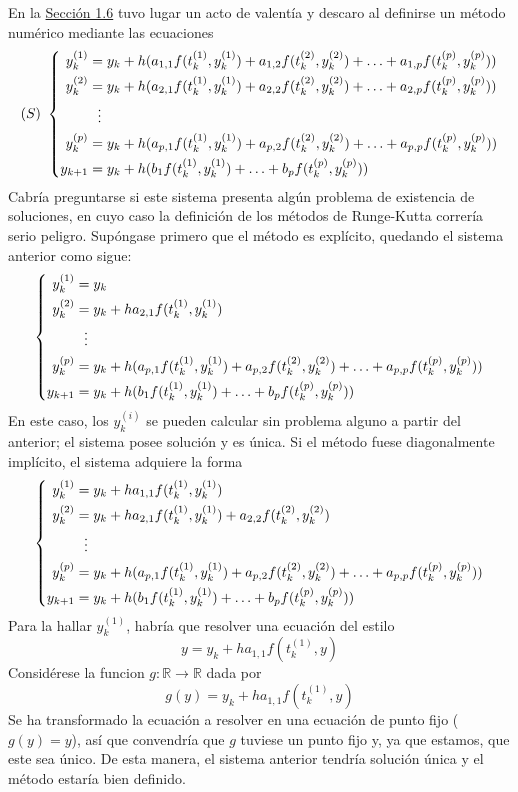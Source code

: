\documentclass[11pt]{report}
\theoremstyle{mytheorem}
\theoremstyle{mydefinition}
\theoremstyle{myexample}
\newcommand{\R}{\mathbb R}
\begin{document}
En la \hyperref[sec1.6]{\color{gray}Sección 1.6} tuvo lugar un acto de valentía y descaro al definirse un método numérico mediante las ecuaciones
\[(S) \ \left\{\begin{alignedat}{1}
    y_k^{(1)} &= y_k+h(a_{1,1}f(t_k^{(1)},y_k^{(1)})+a_{1,2}f(t_k^{(2)},y_k^{(2)})+\mathellipsis+a_{1,p}f(t_k^{(p)},y_k^{(p)})) \\
    y_k^{(2)} &= y_k+h(a_{2,1}f(t_k^{(1)},y_k^{(1)})+a_{2,2}f(t_k^{(2)},y_k^{(2)})+\mathellipsis+a_{2,p}f(t_k^{(p)},y_k^{(p)})) \\
    &\phantom{\vdots} \: \vdots \\
    y_k^{(p)} &= y_k+h(a_{p,1}f(t_k^{(1)},y_k^{(1)})+a_{p,2}f(t_k^{(2)},y_k^{(2)})+\mathellipsis+a_{p,p}f(t_k^{(p)},y_k^{(p)})) \\
    y_{k+1} &= y_k+h(b_1f(t_k^{(1)},y_k^{(1)})+\mathellipsis+b_pf(t_k^{(p)},y_k^{(p)}))
\end{alignedat}\right.\]
Cabría preguntarse si este sistema presenta algún problema de existencia de soluciones, en cuyo caso la definición de los métodos de Runge-Kutta correría serio peligro. Supóngase primero que el método es explícito, quedando el sistema anterior como sigue:
\[\left\{\begin{alignedat}{1}
    y_k^{(1)} &= y_k \\
    y_k^{(2)} &= y_k+ha_{2,1}f(t_k^{(1)},y_k^{(1)}) \\
    &\phantom{\vdots} \: \vdots \\
    y_k^{(p)} &= y_k+h(a_{p,1}f(t_k^{(1)},y_k^{(1)})+a_{p,2}f(t_k^{(2)},y_k^{(2)})+\mathellipsis+a_{p,p}f(t_k^{(p)},y_k^{(p)})) \\
    y_{k+1} &= y_k+h(b_1f(t_k^{(1)},y_k^{(1)})+\mathellipsis+b_pf(t_k^{(p)},y_k^{(p)}))
\end{alignedat}\right.\]
En este caso, los $y_k^{(i)}$ se pueden calcular sin problema alguno a partir del anterior; el sistema posee solución y es única. Si el método fuese diagonalmente implícito, el sistema adquiere la forma
\[\left\{\begin{alignedat}{1}
    y_k^{(1)} &= y_k+ha_{1,1}f(t_k^{(1)},y_k^{(1)})\\
    y_k^{(2)} &= y_k+ha_{2,1}f(t_k^{(1)},y_k^{(1)})+a_{2,2}f(t_k^{(2)},y_k^{(2)})\\
    &\phantom{\vdots} \: \vdots \\
    y_k^{(p)} &= y_k+h(a_{p,1}f(t_k^{(1)},y_k^{(1)})+a_{p,2}f(t_k^{(2)},y_k^{(2)})+\mathellipsis+a_{p,p}f(t_k^{(p)},y_k^{(p)})) \\
    y_{k+1} &= y_k+h(b_1f(t_k^{(1)},y_k^{(1)})+\mathellipsis+b_pf(t_k^{(p)},y_k^{(p)}))
\end{alignedat}\right.\]
Para la hallar $y_k^{(1)}$, habría que resolver una ecuación del estilo \[y = y_k+ha_{1,1}f(t_k^{(1)},y)\] Considérese la funcion $g \colon \R \to \R$ dada por
\[g(y)= y_k+ha_{1,1}f(t_k^{(1)},y) \]
Se ha transformado la ecuación a resolver en una ecuación de punto fijo ($g(y)=y$), así que convendría que $g$ tuviese un punto fijo y, ya que estamos, que este sea único. De esta manera, el sistema anterior tendría solución única y el método estaría bien definido.
\end{document}
